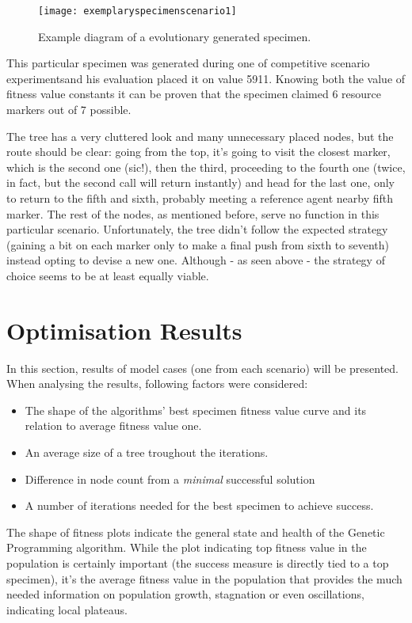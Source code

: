 \begin{figure}[h]
    \centering
    \texttt{[image: exemplaryspecimenscenario1]}
    \caption{Example diagram of a evolutionary generated specimen.}
    \label{fig:x exemplaryspecimenscenario1}
\end{figure}

This particular specimen was generated during one of competitive scenario experimentsand his evaluation placed it on value 5911. Knowing both the value of fitness value constants it can be proven that the specimen claimed 6 resource markers out of 7 possible.

The tree has a very cluttered look and many unnecessary placed nodes, but the route should be clear: going from the top, it's going to visit the closest marker, which is the second one (sic!), then the third, proceeding to the fourth one (twice, in fact, but the second call will return instantly) and head for the last one, only to return to the fifth and sixth, probably meeting a reference agent nearby fifth marker. The rest of the nodes, as mentioned before, serve no function in this particular scenario. Unfortunately, the tree didn't follow the expected strategy (gaining a bit on each marker only to make a final push from sixth to seventh) instead opting to devise a new one. Although - as seen above - the strategy of choice seems to be at least equally viable.
\section{Optimisation Results}
In this section, results of model cases (one from each scenario) will be presented. When analysing the results, following factors were considered:
\begin{itemize}
    \item The shape of the algorithms' best specimen fitness value curve and its relation to average fitness value one.
    \item An average size of a tree troughout the iterations.
    \item Difference in node count from a \textit{minimal} successful solution %
    \item A number of iterations needed for the best specimen to achieve success.
\end{itemize}
The shape of fitness plots indicate the general state and health of the Genetic Programming algorithm. While the plot indicating top fitness value in the population is certainly important (the success measure is directly tied to a top specimen), it's the average fitness value in the population that provides the much needed information on population growth, stagnation or even oscillations, indicating local plateaus.

